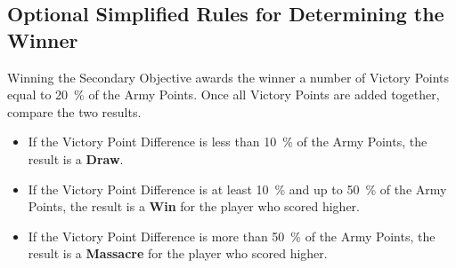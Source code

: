 \begin{optionalrules}
\subsection{Optional Simplified Rules for Determining the Winner}

Winning the Secondary Objective awards the winner a number of Victory Points equal to \SI{20}{\percent} of the Army Points. Once all Victory Points are added together, compare the two results.
\begin{itemize}
\item If the Victory Point Difference is less than \SI{10}{\percent} of the Army Points, the result is a \textbf{Draw}.
\item If the Victory Point Difference is at least \SI{10}{\percent} and up to \SI{50}{\percent} of the Army Points, the result is a \textbf{Win} for the player who scored higher.
\item If the Victory Point Difference is more than \SI{50}{\percent} of the Army Points, the result is a \textbf{Massacre} for the player who scored higher.
\end{itemize}
\end{optionalrules}

\debugfooter %
